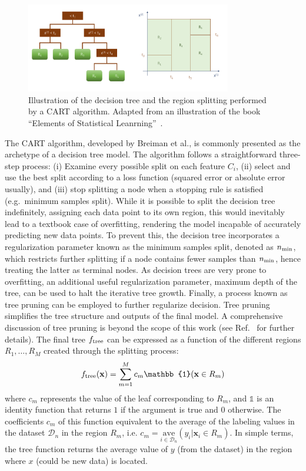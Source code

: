 \documentclass[main]{subfiles}
\begin{document}
\begin{figure}[ht]
  \centering
  \includegraphics[width=0.8\textwidth]{figures/4-ml/decision_tree.pdf}
  \caption{Illustration of the decision tree and the region splitting performed by a CART\autocite{Breiman_2017} algorithm. Adapted from an illustration of the book ``Elements of Statistical Leanrning''~\cite{Hastie_2009}.}\label{fgr:tree}
\end{figure}

The CART\autocite{Breiman_2017} algorithm, developed by Breiman et al., is commonly presented as the archetype of a decision tree model. The algorithm follows a straightforward three-step process: (i) Examine every possible split on each feature $C_i$, (ii) select and use the best split according to a loss function (squared error or absolute error usually), and (iii) stop splitting a node when a stopping rule is satisfied (e.g.\ minimum samples split).\autocite{Dension_1998} While it is possible to split the decision tree indefinitely, assigning each data point to its own region, this would inevitably lead to a textbook case of overfitting, rendering the model incapable of accurately predicting new data points. To prevent this, the decision tree incorporates a regularization parameter known as the minimum samples split, denoted as $n_{\text{min}}$, which restricts further splitting if a node contains fewer samples than $n_{\text{min}}$, hence treating the latter as terminal nodes. As decision trees are very prone to overfitting, an additional useful regularization parameter, maximum depth of the tree, can be used to halt the iterative tree growth. Finally, a process known as tree pruning can be employed to further regularize decision. Tree pruning simplifies the tree structure and outputs of the final model. A comprehensive discussion of tree pruning is beyond the scope of this work (see Ref.~\cite{Hastie_2009} for further details). The final tree $f_{\text{tree}}$ can be expressed as a function of the different regions $R_1,\ldots,R_M$ created through the splitting process:
\begin{equation}
  f\e{tree}(\mathbf{x}) = \sum_{m=1}^M c_m \mathbb{1}(\mathbf{x}\in R_m)
\end{equation}
where $c_m$ represents the value of the leaf corresponding to $R_m$, and $\mathbb{1}$ is an identity function that returns $1$ if the argument is true and $0$ otherwise. The coefficients $c_m$ of this function equivalent to the average of the labeling values in the dataset $\mathcal{D}_n$ in the region $R_m$, i.e. $c_m= \underset{i\in \mathcal{D}_n}{\text{ave}}(y_i|\mathbf{x}_i\in R_m)$.
In simple terms, the tree function returns the average value of $y$ (from the dataset) in the region where $x$ (could be new data) is located. 
\end{document}
